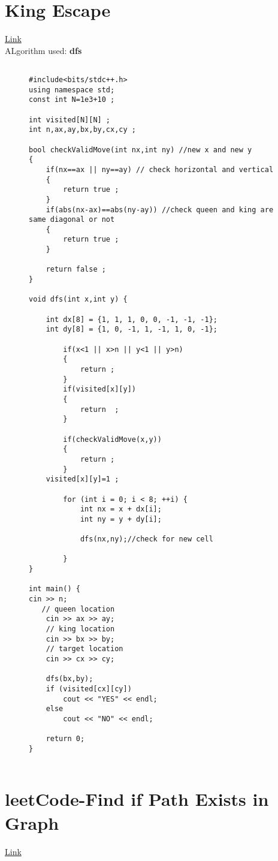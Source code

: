 \documentclass{article}
\begin{document}
\section{King Escape} \href{https://codeforces.com/problemset/problem/1033/A}{Link} \\


ALgorithm used: \textbf{dfs }


\begin{figure}[H] 
{
\small
\begin{lstlisting}[caption={},aboveskip=0pt, belowskip=0pt]

#include<bits/stdc++.h>
using namespace std;
const int N=1e3+10 ;

int visited[N][N] ;
int n,ax,ay,bx,by,cx,cy ;

bool checkValidMove(int nx,int ny) //new x and new y
{
    if(nx==ax || ny==ay) // check horizontal and vertical
    {
        return true ;
    }
    if(abs(nx-ax)==abs(ny-ay)) //check queen and king are same diagonal or not
    {
        return true ;
    }

    return false ;
}

void dfs(int x,int y) {

    int dx[8] = {1, 1, 1, 0, 0, -1, -1, -1};
    int dy[8] = {1, 0, -1, 1, -1, 1, 0, -1};

        if(x<1 || x>n || y<1 || y>n)
        {
            return ;
        }
        if(visited[x][y])
        {
            return  ;
        }

        if(checkValidMove(x,y))
        {
            return ;
        }
    visited[x][y]=1 ;

        for (int i = 0; i < 8; ++i) {
            int nx = x + dx[i];
            int ny = y + dy[i];

            dfs(nx,ny);//check for new cell

        }
}

int main() {
cin >> n;
   // queen location
    cin >> ax >> ay;
    // king location
    cin >> bx >> by;
    // target location
    cin >> cx >> cy;

    dfs(bx,by);
    if (visited[cx][cy])
        cout << "YES" << endl;
    else
        cout << "NO" << endl;

    return 0;
}


\end{lstlisting}

}
\end{figure}


\section{ leetCode-Find if Path Exists in Graph
} \href{https://leetcode.com/problems/find-if-path-exists-in-graph/description/}{Link} \\
\end{document}
